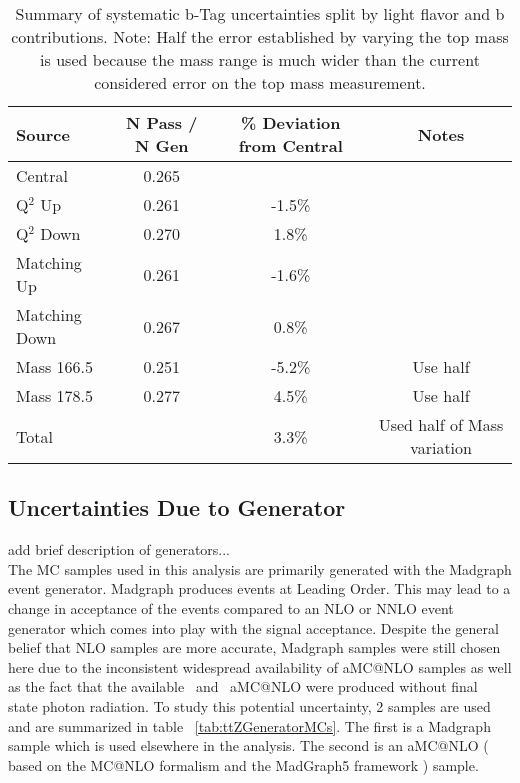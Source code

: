 \begin{table}[h]
\begin{center}
\caption{\small\label{tab:systupdown} Summary of systematic b-Tag uncertainties split by light flavor and b contributions. Note: Half the error established by varying the top mass is used because the mass range is much wider than the current considered error on the top mass measurement.}
\begin{tabular}{lccc}\hline
Source                  &  N Pass / N Gen & \% Deviation from Central & Notes\\ \hline
Central                 & 0.265 & & \\
Q$^2$ Up                 & 0.261 & -1.5\% & \\
Q$^2$ Down           & 0.270 & 1.8\% & \\
Matching Up       & 0.261 & -1.6\% & \\
Matching Down  & 0.267 & 0.8\% & \\
Mass 166.5         & 0.251 & -5.2\% & Use half \\
Mass 178.5         & 0.277 & 4.5\% & Use half \\
\hline
Total                     &             & 3.3\% & Used half of Mass variation \\
\hline
\end{tabular}
\end{center}
\end{table}


\subsection{Uncertainties Due to Generator}	
add brief description of generators...\\

The MC samples used in this analysis are primarily generated with the Madgraph event generator. Madgraph produces events at Leading Order. This may lead to a change in acceptance of the events compared to an NLO or NNLO event generator which comes into play with the signal acceptance. Despite the general belief that NLO samples are more accurate, Madgraph samples were still chosen here due to the inconsistent widespread availability of aMC@NLO samples as well as the fact that the available \ttZ \ and \ttW \ aMC@NLO were produced without final state photon radiation. To study this potential uncertainty, 2 \ttZ samples are used and are summarized in table ~\ref{tab:ttZGeneratorMCs}. The first is a Madgraph ~\cite{Alwall:2011uj} sample which is used elsewhere in the analysis. The second is an aMC@NLO (~\cite{Frederix:2011zi, Frederix:2011ss} based on the MC@NLO formalism \cite{Frixione:2002ik} and the MadGraph5 framework \cite{Alwall:2011uj}) sample. \\








